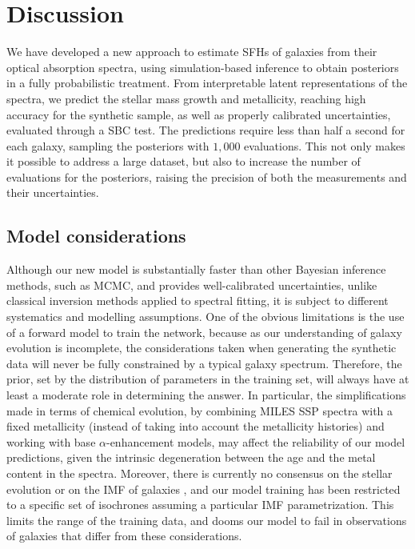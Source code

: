 \section{Discussion}

\label{discussion}

We have developed a new approach to estimate SFHs of galaxies from their optical absorption spectra, using simulation-based inference to obtain posteriors in a fully probabilistic treatment. From interpretable latent representations of the spectra, we predict the stellar mass  growth and metallicity, reaching high accuracy for the synthetic sample, as well as  properly calibrated uncertainties, evaluated through a SBC test. The predictions require less than half a second for each galaxy, sampling the posteriors with $1{,}000$ evaluations. This not only makes it possible to address a large dataset, but also to increase the number of evaluations for the posteriors, raising the precision of both the measurements and their uncertainties. \\


\subsection{Model considerations}

Although our new model is substantially faster than other Bayesian inference methods, such as MCMC, and provides well-calibrated uncertainties, unlike classical inversion methods applied to spectral fitting, it is subject to different systematics and modelling assumptions. One of the obvious limitations is the use of a forward model to train the network, because as our understanding of galaxy evolution is incomplete, the considerations taken when generating the synthetic data will never be fully constrained by a typical galaxy spectrum. Therefore, the prior, set by the distribution of parameters in the training set, will always have at least a moderate role in determining the answer. In particular, the simplifications made in terms of chemical evolution, by combining MILES SSP spectra with a fixed metallicity (instead of taking into account the metallicity histories) and working with base $\alpha$-enhancement models, may affect the reliability of our model predictions, given the intrinsic degeneration between the age and the metal content in the spectra. Moreover, there is currently no consensus on the stellar evolution \citep{Conroy_2009} or on the IMF of galaxies \citep{Mart_n_Navarro_2014}, and our model training has been restricted to a specific set of isochrones assuming a particular IMF parametrization. This limits the range of the training data, and dooms our model to fail in observations of galaxies that differ from these considerations.\\

